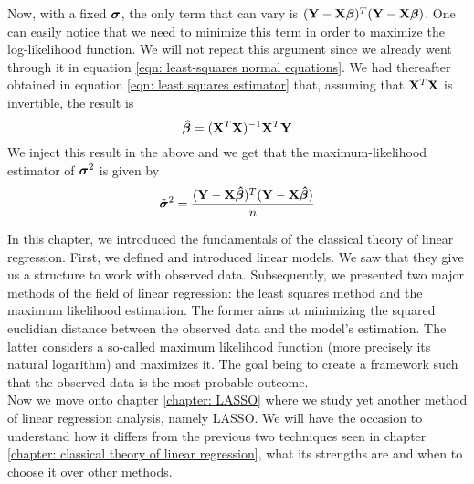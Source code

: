 Now, with a fixed \(\boldsymbol{\sigma}\), the only term that can vary is \(( \mathbf{Y} - \mathbf{X} \boldsymbol{\beta} )^T ( \mathbf{Y} - \mathbf{X} \boldsymbol{\beta} )\). One can easily notice that we need to minimize this term in order to maximize the log-likelihood function. We will not repeat this argument since we already went through it in equation \eqref{eqn: least-squares normal equations}. We had thereafter obtained in equation \eqref{eqn: least squares estimator} that, assuming that \(\mathbf{X}^T \mathbf{X}\) is invertible, the result is
\[
    \boldsymbol{\hat{\beta}} = (\mathbf{X}^T \mathbf{X})^{-1} \mathbf{X}^T \mathbf{Y}
\]
We inject this result in the above and we get that the maximum-likelihood estimator of \(\boldsymbol{\sigma}^2\) is given by
\[
    \tilde {\boldsymbol{\sigma}}^2 = \frac{( \mathbf{Y} - \mathbf{X} \boldsymbol{\hat{\beta}} )^T ( \mathbf{Y} - \mathbf{X} \boldsymbol{\hat{\beta}} )}{n}
\]

In this chapter, we introduced the fundamentals of the classical theory of linear regression. First, we defined and introduced linear models. We saw that they give us a structure to work with observed data. Subsequently, we presented two major methods of the field of linear regression: the least squares method and the maximum likelihood estimation. The former aims at minimizing the squared euclidian distance between the observed data and the model's estimation. The latter considers a so-called maximum likelihood function (more precisely its natural logarithm) and maximizes it. The goal being to create a framework such that the observed data is the most probable outcome. \\
Now we move onto chapter \ref{chapter: LASSO} where we study yet another method of linear regression analysis, namely LASSO. We will have the occasion to understand how it differs from the previous two techniques seen in chapter \ref{chapter: classical theory of linear regression}, what its strengths are and when to choose it over other methods.